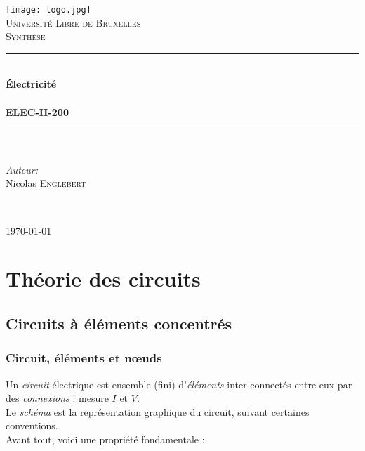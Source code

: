 \documentclass	[11pt, a4paper, openany]{book}
\begin{document}
\renewcommand{\proofname}{Démonstration}
\mainmatter
\begin{titlepage}
\begin{center}	
	
	\newcommand{\HRule}{\rule{\linewidth}{0.5mm}}   			%
	\texttt{[image: logo.jpg]}~\\[1cm]				%

	\textsc{\LARGE Université Libre de Bruxelles}\\[1.5cm]
	\textsc{\Large Synthèse}\\[0.5cm]

	\HRule \\[0.4cm]
	{ \huge \bfseries Électricité \\ \ \\ ELEC-H-200 \\[0.4cm] }


	\HRule \\[1.5cm]
		\begin{minipage}{0.4\textwidth}
		\begin{flushleft} \large
		
		\emph{Auteur:}\\
			Nicolas \textsc{Englebert}\\
			\end{flushleft}
			\end{minipage}
			\begin{minipage}{0.4\textwidth}
			\begin{flushright} \large
			\emph{} \\		
			\textsc{}
			\end{flushright}
		\end{minipage}

	\vfill

{\large \today}

\end{center}
\end{titlepage}




\part{Théorie des circuits}
\chapter{Circuits à éléments concentrés}
\section{Circuit, éléments et nœuds}
Un \textit{circuit} électrique est ensemble  (fini) d'\textit{éléments} inter-connectés entre eux par des \textit{connexions} : mesure $I$ et $V$.\\
 Le \textit{schéma} est la représentation graphique du circuit, suivant certaines conventions.\\
Avant tout, voici une propriété fondamentale :\\
\end{document}
